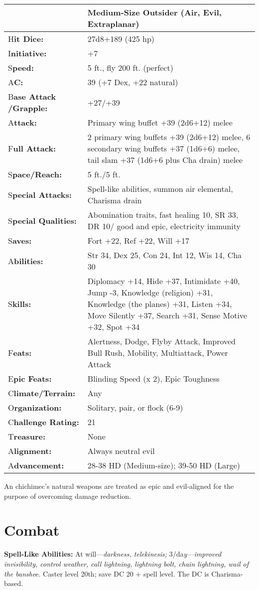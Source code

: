 \documentclass{article}
\begin{document}
\begin{tabular}{|>{\raggedright}p{63pt}|>{\raggedright}p{262pt}|}
\hline
  & Medium-Size Outsider (Air, Evil, Extraplanar) \tabularnewline
\hline
H\textbf{it Dice:}  & 27d8+189 (425 hp) \tabularnewline
\hline
I\textbf{nitiative:}  & +7 \tabularnewline
\hline
S\textbf{peed:}  & 5 ft., fly 200 ft. (perfect) \tabularnewline
\hline
A\textbf{C:}  & 39 (+7 Dex, +22 natural) \tabularnewline
\hline
B\textbf{ase Attack /Grapple:}  & +27/+39\tabularnewline
\hline
A\textbf{ttack:} &  Primary wing buffet +39 (2d6+12) melee\tabularnewline
\hline
F\textbf{ull Attack:} &  2 primary wing buffets +39 (2d6+12) melee, 6 secondary 
wing buffets +37 (1d6+6) melee, tail slam +37 (1d6+6 plus Cha drain) melee\tabularnewline
\hline
S\textbf{pace/Reach:} &  5 ft./5 ft. \tabularnewline
\hline
S\textbf{pecial Attacks:} &  Spell-like abilities, summon air elemental, Charisma 
drain \tabularnewline
\hline
S\textbf{pecial Qualities:} &  Abomination traits, fast healing 10, SR 33, DR 10/ 
good and epic, electricity immunity \tabularnewline
\hline
S\textbf{aves:} &  Fort +22, Ref +22, Will +17 \tabularnewline
\hline
A\textbf{bilities:} &  Str 34, Dex 25, Con 24, Int 12, Wis 14, Cha 30 \tabularnewline
\hline
S\textbf{kills:} &  Diplomacy +14, Hide +37, Intimidate +40, Jump -3, Knowledge 
(religion) +31, Knowledge (the planes) +31, Listen +34, Move Silently +37, Search 
+31, Sense Motive +32, Spot +34\tabularnewline
\hline
F\textbf{eats:} &  Alertness, Dodge, Flyby Attack, Improved Bull Rush, Mobility, 
Multiattack, Power Attack \tabularnewline
\hline
E\textbf{pic Feats:} &  Blinding Speed (x 2), Epic Toughness\tabularnewline
\hline
C\textbf{limate/Terrain:} &  Any \tabularnewline
\hline
O\textbf{rganization:} &  Solitary, pair, or flock (6-9) \tabularnewline
\hline
C\textbf{hallenge Rating:} &  21 \tabularnewline
\hline
T\textbf{reasure:} &  None \tabularnewline
\hline
A\textbf{lignment:} &  Always neutral evil \tabularnewline
\hline
A\textbf{dvancement:} &  28-38 HD (Medium-size); 39-50 HD (Large) \tabularnewline
\hline
\end{tabular}

An chichimec's natural weapons are treated as epic and evil-aligned for the purpose 
of overcoming damage reduction.

\section*{Combat\textbf{ }}

\textbf{Spell-Like Abilities:} At will---\textit{darkness, telekinesis; }3/da\textit{y---improved 
invisibility, control weather, call lightning, lightning bolt, chain lightning, 
wail of the banshe}e. Caster level 20th; save DC 20 + spell level. The DC is Charisma-based.
\end{document}
